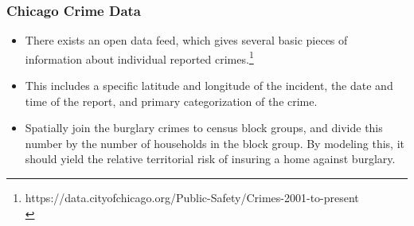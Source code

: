 \begin{frame}
  \frametitle{Chicago Crime Data}
  \footnotesize

  \begin{itemize}
  \item There exists an open data feed, which gives
    several basic pieces of information about individual reported
    crimes.\footnote{https://data.cityofchicago.org/Public-Safety/Crimes-2001-to-present\\}
  \item This includes a specific latitude and longitude of the incident, the
    date and time of the report, and primary categorization of the crime.
  \item {} Spatially join the burglary crimes
    to census block groups, and divide this number by the number of households in
    the block group. By modeling this, it should yield the relative territorial risk of
    insuring a home against burglary.
  \end{itemize}

\end{frame}


